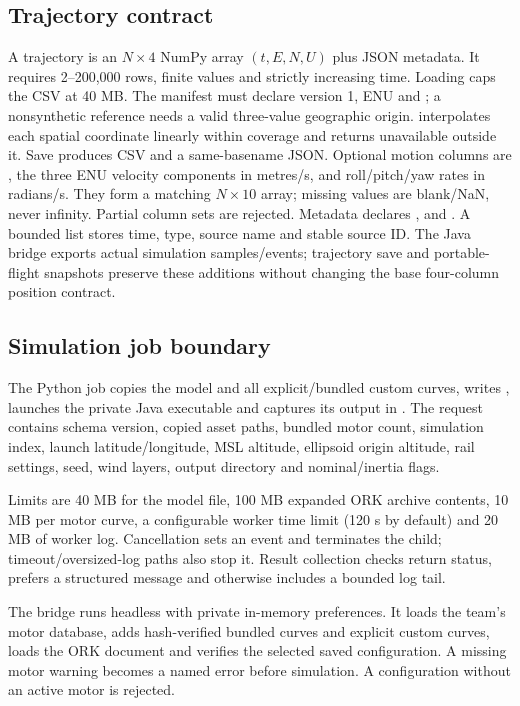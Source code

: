 \subsection{Trajectory contract}
A trajectory is an \(N\times4\) NumPy array \((t,E,N,U)\) plus JSON metadata.
It requires 2--200,000 rows, finite values and strictly increasing time.
Loading caps the CSV at 40 MB. The manifest must declare version 1, ENU and
; a nonsynthetic reference needs a valid three-value geographic origin.
 interpolates each spatial coordinate linearly within coverage and
returns unavailable outside it. Save produces CSV and a same-basename JSON.
Optional motion columns are , the three ENU velocity components
in metres/s, and roll/pitch/yaw rates in radians/s. They form a matching
$N\times10$ array; missing values are blank/NaN, never infinity. Partial column
sets are rejected. Metadata declares ,
 and . A bounded
 list stores time, type, source name and stable source ID.
The Java bridge exports actual simulation samples/events; trajectory save and
portable-flight snapshots preserve these additions without changing the base
four-column position contract.

\subsection{Simulation job boundary}
The Python job copies the model and all explicit/bundled custom curves, writes
, launches the private Java executable and captures its output
in . The request contains schema version, copied asset paths,
bundled motor count, simulation index, launch latitude/longitude, MSL altitude,
ellipsoid origin altitude, rail settings, seed, wind layers, output directory
and nominal/inertia flags.



Limits are 40 MB for the model file, 100 MB expanded ORK archive contents,
10 MB per motor curve, a configurable worker time limit (120 s by default) and 20 MB of worker log.
Cancellation sets an event and terminates the child; timeout/oversized-log paths
also stop it. Result collection checks return status, prefers a structured
 message and otherwise includes a bounded log tail.

The bridge runs headless with private in-memory preferences. It loads the team's
motor database, adds hash-verified bundled curves and explicit custom curves,
loads the ORK document and verifies the selected saved configuration. A missing
motor warning becomes a named error before simulation. A configuration without
an active motor is rejected.


